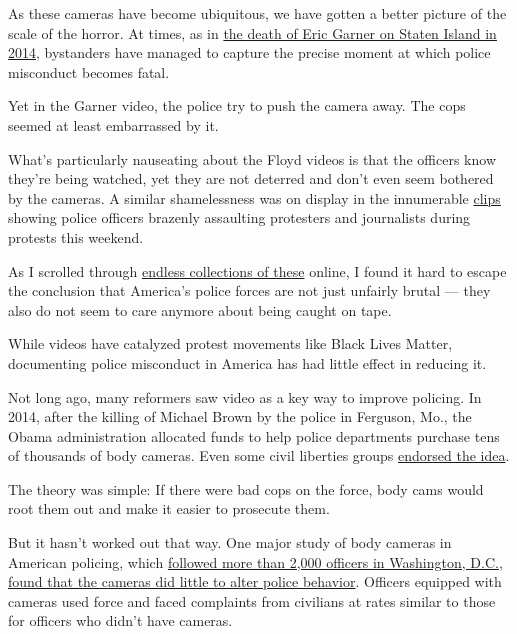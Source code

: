 As these cameras have become ubiquitous, we have gotten a better picture
of the scale of the horror. At times, as in
\href{https://www.theguardian.com/us-news/video/2014/dec/04/i-cant-breathe-eric-garner-chokehold-death-video}{the
death of Eric Garner on Staten Island in 2014}, bystanders have managed
to capture the precise moment at which police misconduct becomes fatal.

Yet in the Garner video, the police try to push the camera away. The
cops seemed at least embarrassed by it.

What's particularly nauseating about the Floyd videos is that the
officers know they're being watched, yet they are not deterred and don't
even seem bothered by the cameras. A similar shamelessness was on
display in the innumerable
\href{https://www.theverge.com/2020/5/31/21276044/police-violence-protest-george-floyd}{clips}
showing police officers brazenly assaulting protesters and journalists
during protests this weekend.

As I scrolled through
\href{https://twitter.com/fmanjoo/status/1267290935198486529?s=20}{endless
collections of these} online, I found it hard to escape the conclusion
that America's police forces are not just unfairly brutal --- they also
do not seem to care anymore about being caught on tape.

While videos have catalyzed protest movements like Black Lives Matter,
documenting police misconduct in America has had little effect in
reducing it.

Not long ago, many reformers saw video as a key way to improve policing.
In 2014, after the killing of Michael Brown by the police in Ferguson,
Mo., the Obama administration allocated funds to help police departments
purchase tens of thousands of body cameras. Even some civil liberties
groups
\href{https://www.aclu.org/other/police-body-mounted-cameras-right-policies-place-win-all?redirect=technology-and-liberty/police-body-mounted-cameras-right-policies-place-win-all\#control\%22\%3E\%20position\%20paper\%20\%3C/a\%3Esupporting\%20the\%20use\%20of\%20bodycams\%20by\%20police.}{endorsed
the idea}.

The theory was simple: If there were bad cops on the force, body cams
would root them out and make it easier to prosecute them.

But it hasn't worked out that way. One major study of body cameras in
American policing, which
\href{https://www.pnas.org/content/116/21/10329.short?rss=1}{followed
more than 2,000 officers in Washington, D.C.},
\href{https://www.nytimes.com/2017/10/20/upshot/a-big-test-of-police-body-cameras-defies-expectations.html}{found
that the cameras did little to alter police behavior}. Officers equipped
with cameras used force and faced complaints from civilians at rates
similar to those for officers who didn't have cameras.

